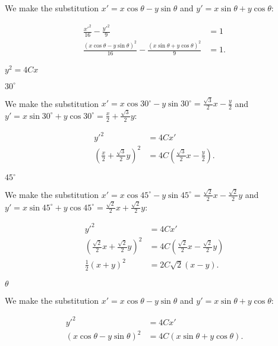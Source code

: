 \documentclass[../key.tex]{subfiles}
\begin{document}
\noindent We make the substitution $x'=x \cos \theta - y\sin \theta$ and $y'=x\sin \theta + y\cos \theta$:

\begin{align*}
\frac{x'^2}{16}-\frac{y'^2}{9} &= 1 \\
\frac{\left(x \cos \theta - y\sin \theta\right)^2}{16} - \frac{\left(x\sin \theta + y\cos \theta\right)^2}{9} &= 1.
\end{align*}

\begin{inner_problem}
\item $y^2=4Cx$
\end{inner_problem}

\begin{iinner_problem}[start=1]
\item $30^\circ$
\end{iinner_problem}

\noindent We make the substitution $x'=x \cos 30^\circ - y\sin 30^\circ=\frac{\sqrt{3}}{2}x-\frac{y}{2}$ and $y'=x\sin 30^\circ + y\cos 30^\circ=\frac{x}{2}+\frac{\sqrt{3}}{2}y$:

\begin{align*}
y'^2&=4Cx' \\
\left(\frac{x}{2}+\frac{\sqrt{3}}{2}y\right)^2 &= 4C\left(\frac{\sqrt{3}}{2}x-\frac{y}{2}\right).
\end{align*}

\begin{iinner_problem}
\item $45^\circ$
\end{iinner_problem}

\noindent We make the substitution $x'=x \cos 45^\circ - y\sin 45^\circ=\frac{\sqrt{2}}{2}x-\frac{\sqrt{2}}{2}y$ and $y'=x\sin 45^\circ + y\cos 45^\circ=\frac{\sqrt{2}}{2}x+\frac{\sqrt{2}}{2}y$:

\begin{align*}
y'^2&=4Cx' \\
\left(\frac{\sqrt{2}}{2}x+\frac{\sqrt{2}}{2}y\right)^2 &= 4C\left(\frac{\sqrt{2}}{2}x-\frac{\sqrt{2}}{2}y\right) \\
\frac{1}{2}(x+y)^2 &= 2C\sqrt{2}(x-y).
\end{align*}

\begin{iinner_problem}
\item $\theta$
\end{iinner_problem}

We make the substitution $x'=x \cos \theta - y\sin \theta$ and $y'=x\sin \theta + y\cos \theta$:

\begin{align*}
y'^2&=4Cx' \\
\left(x \cos \theta - y\sin \theta\right)^2 &= 4C\left(x\sin \theta + y\cos \theta\right).
\end{align*}
\end{document}
